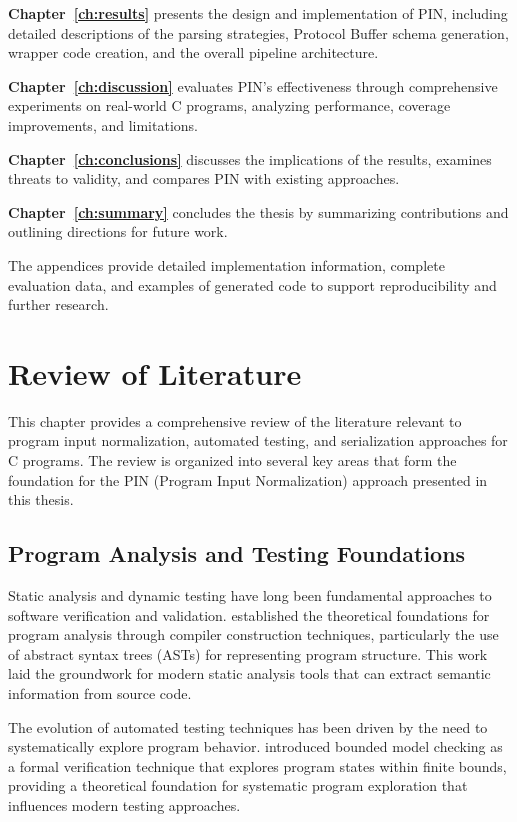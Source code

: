 \documentclass[doublespace,nopageskip]{VTthesis} %
\begin{document}
	\textbf{Chapter~\ref{ch:results}} presents the design and implementation of PIN, including detailed descriptions of the parsing strategies, Protocol Buffer schema generation, wrapper code creation, and the overall pipeline architecture.
	
	\textbf{Chapter~\ref{ch:discussion}} evaluates PIN's effectiveness through comprehensive experiments on real-world C programs, analyzing performance, coverage improvements, and limitations.
	
	\textbf{Chapter~\ref{ch:conclusions}} discusses the implications of the results, examines threats to validity, and compares PIN with existing approaches.
	
	\textbf{Chapter~\ref{ch:summary}} concludes the thesis by summarizing contributions and outlining directions for future work.
	
	The appendices provide detailed implementation information, complete evaluation data, and examples of generated code to support reproducibility and further research.

    \chapter{Review of Literature} \label{ch:lit_review}
    
    This chapter provides a comprehensive review of the literature relevant to program input normalization, automated testing, and serialization approaches for C programs. The review is organized into several key areas that form the foundation for the PIN (Program Input Normalization) approach presented in this thesis.
    
    \section{Program Analysis and Testing Foundations} \label{se:program_analysis_foundations}
    
    Static analysis and dynamic testing have long been fundamental approaches to software verification and validation. \citet{aho2006compilers} established the theoretical foundations for program analysis through compiler construction techniques, particularly the use of abstract syntax trees (ASTs) for representing program structure. This work laid the groundwork for modern static analysis tools that can extract semantic information from source code.
    
    The evolution of automated testing techniques has been driven by the need to systematically explore program behavior. \citet{clarke2004bounded} introduced bounded model checking as a formal verification technique that explores program states within finite bounds, providing a theoretical foundation for systematic program exploration that influences modern testing approaches.
    
\end{document}
